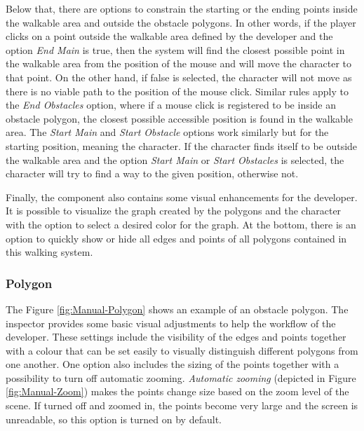 Below that, there are options to constrain the starting or the ending points inside the walkable area and outside the obstacle polygons. In other words, if the player clicks on a point outside the walkable area defined by the developer and the option \textit{End Main} is true, then the system will find the closest possible point in the walkable area from the position of the mouse and will move the character to that point. On the other hand, if false is selected, the character will not move as there is no viable path to the position of the mouse click. Similar rules apply to the \textit{End Obstacles} option, where if a mouse click is registered to be inside an obstacle polygon, the closest possible accessible position is found in the walkable area. The \textit{Start Main} and \textit{Start Obstacle} options work similarly but for the starting position, meaning the character. If the character finds itself to be outside the walkable area and the option \textit{Start Main} or \textit{Start Obstacles} is selected, the character will try to find a way to the given position, otherwise not.

Finally, the component also contains some visual enhancements for the developer. It is possible to visualize the graph created by the polygons and the character with the option to select a desired color for the graph. At the bottom, there is an option to quickly show or hide all edges and points of all polygons contained in this walking system. 

\subsubsection{Polygon}
The Figure \ref{fig:Manual-Polygon} shows an example of an obstacle polygon. The inspector provides some basic visual adjustments to help the workflow of the developer. These settings include the visibility of the edges and points together with a colour that can be set easily to visually distinguish different polygons from one another. One option also includes the sizing of the points together with a possibility to turn off automatic zooming. \textit{Automatic zooming} (depicted in Figure \ref{fig:Manual-Zoom}) makes the points change size based on the zoom level of the scene. If turned off and zoomed in, the points become very large and the screen is unreadable, so this option is turned on by default.

